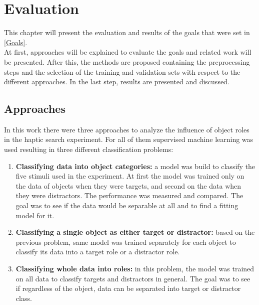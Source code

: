 
\chapter{Evaluation} %

\label{Evaluation} %
This chapter will present the evaluation and results of the goals that were set in \ref{Goals}.\\
At first, approaches will be explained to evaluate the goals and related work will be presented. After this, the methods are proposed containing the preprocessing steps and the selection of the training and validation sets with respect to the different approaches. In the last step, results are presented and discussed.


\section{Approaches}
In this work there were three approaches to analyze the influence of object roles in the haptic search experiment. For all of them supervised machine learning was used resulting in three different classification problems: \\
\begin{enumerate}
	\item \textbf{Classifying data into object categories:} a model was build to classify the five stimuli used in the experiment. At first the model was trained only on the data of objects when they were targets, and second on the data when they were distractors. The performance was measured and compared. The goal was to see if the data would be separable at all and to find a fitting model for it.
	
	\item \textbf{Classifying a single object as either target or distractor:} based on the previous problem, same model was trained separately for each object to classify its data into a target role or a distractor role. 
	
	\item \textbf{Classifying whole data into roles:} in this problem, the model was trained on all data to classify targets and distractors in general. The goal was to see if regardless of the object, data can be separated into target or distractor class.       
\end{enumerate}

